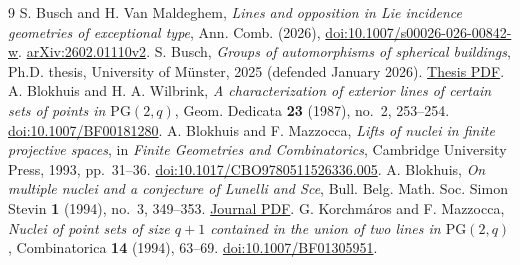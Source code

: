 \documentclass[11pt,a4paper]{amsart}
\newcommand{\PG}{\mathrm{PG}}
\begin{document}
\begin{thebibliography}{9}
S. Busch and H. Van Maldeghem, \emph{Lines and opposition in Lie incidence geometries of exceptional type}, Ann. Comb. (2026), \href{https://doi.org/10.1007/s00026-026-00842-w}{doi:10.1007/s00026-026-00842-w}. \href{https://arxiv.org/html/2602.01110v2#S5.SS1}{arXiv:2602.01110v2}.
S. Busch, \emph{Groups of automorphisms of spherical buildings}, Ph.D. thesis, University of M\"unster, 2025 (defended January 2026). \href{https://sirabusch.de/dissertationSiraBusch.pdf#page=308}{Thesis PDF}.
A. Blokhuis and H. A. Wilbrink, \emph{A characterization of exterior lines of certain sets of points in \(\PG(2,q)\)}, Geom. Dedicata \textbf{23} (1987), no.~2, 253--254. \href{https://doi.org/10.1007/BF00181280}{doi:10.1007/BF00181280}.
A. Blokhuis and F. Mazzocca, \emph{Lifts of nuclei in finite projective spaces}, in \emph{Finite Geometries and Combinatorics}, Cambridge University Press, 1993, pp.~31--36. \href{https://doi.org/10.1017/CBO9780511526336.005}{doi:10.1017/CBO9780511526336.005}.
A. Blokhuis, \emph{On multiple nuclei and a conjecture of Lunelli and Sce}, Bull. Belg. Math. Soc. Simon Stevin \textbf{1} (1994), no.~3, 349--353. \href{https://www.maths.tcd.ie/EMIS/journals/BBMS/Bulletin/bul943/AART.PDF}{Journal PDF}.
G. Korchm\'{a}ros and F. Mazzocca, \emph{Nuclei of point sets of size \(q+1\) contained in the union of two lines in \(\PG(2,q)\)}, Combinatorica \textbf{14} (1994), 63--69. \href{https://doi.org/10.1007/BF01305951}{doi:10.1007/BF01305951}.
\end{thebibliography}
\end{document}
